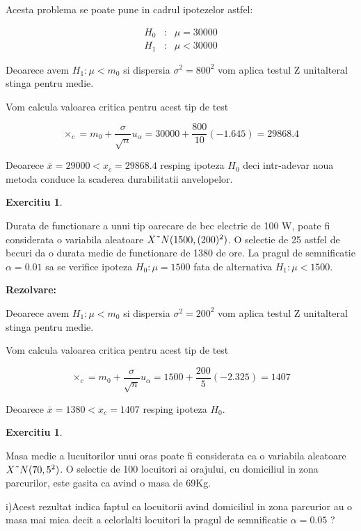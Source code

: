 \documentclass{article}
\newtheorem{exercise}[theorem]{Exercitiu}
\begin{document}
Acesta problema se poate pune in cadrul ipotezelor astfel:

\begin{eqnarray*}
H_{0} &:&\mu =30000 \\
H_{1} &:&\mu <30000
\end{eqnarray*}

Deoarece avem $H_{1}:\mu <m_{0}$ si dispersia $\sigma ^{2}=800^{2}$ vom
aplica testul Z unitalteral stinga pentru medie.

Vom calcula valoarea critica pentru acest tip de test

\[
\times _{c}=m_{0}+\frac{\sigma }{\sqrt{n}}u_{\alpha }=30000+\frac{800}{10}%
(-1.645)=29868.4 
\]

Deoarece $\overline{x}=29000<x_{c}=29868.4$ resping ipoteza $H_{0}$ deci
intr-adevar noua metoda conduce la scaderea durabilitatii anvelopelor.

\begin{exercise}
\bigskip 
\end{exercise}

Durata de functionare a unui tip oarecare de bec electric de 100 W, poate fi
considerata o variabila aleatoare $X\symbol{126}N(1500,(200)^{2})$. O
selectie de 25 astfel de becuri da o durata medie de functionare de 1380 de
ore. La pragul de semnificatie $\alpha =0.01$ sa se verifice ipoteza $%
H_{0}:\mu =1500$ fata de alternativa $H_{1}:\mu <1500$.

\textbf{Rezolvare:}

Deoarece avem $H_{1}:\mu <m_{0}$ si dispersia $\sigma ^{2}=200^{2}$ vom
aplica testul Z unitalteral stinga pentru medie.

Vom calcula valoarea critica pentru acest tip de test

\[
\times _{c}=m_{0}+\frac{\sigma }{\sqrt{n}}u_{\alpha }=1500+\frac{200}{5}%
(-2.325)=1407 
\]

Deoarece $\overline{x}=1380<x_{c}=1407$ resping ipoteza $H_{0}$.

\begin{exercise}
\bigskip 
\end{exercise}

Masa medie a lucuitorilor unui oras poate fi considerata ca o variabila
aleatoare $X\symbol{126}N(70,5^{2})$. O selectie de 100 locuitori ai
orajului, cu domiciliul in zona parcurilor, este gasita ca avind o masa de
69Kg.

i)Acest rezultat indica faptul ca locuitorii avind domiciliul in zona
parcurior au o masa mai mica decit a celorlalti locuitori la pragul de
semnificatie $\alpha =0.05$ ?
\end{document}
